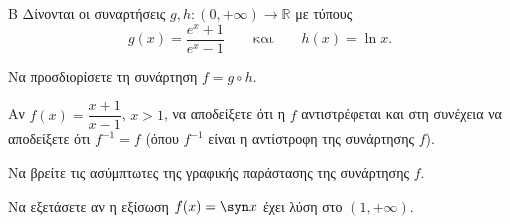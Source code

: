 \begin{thema}{Β}
Δίνονται οι συναρτήσεις $g, h: (0, +\infty) \to \mathbb{R}$ με τύπους
\[
g(x) = \frac{e^x + 1}{e^x - 1} \qquad \text{και} \qquad h(x) = \ln x.
\]
\begin{erwthma}
    \item Να προσδιορίσετε τη συνάρτηση $f = g \circ h$. 

    \item Αν $f(x) = \dfrac{x+1}{x-1}$, $x > 1$, να αποδείξετε ότι η $f$ αντιστρέφεται και στη συνέχεια να αποδείξετε ότι $f^{-1} = f$ (όπου $f^{-1}$ είναι η αντίστροφη της συνάρτησης $f$). 

    \item Να βρείτε τις ασύμπτωτες της γραφικής παράστασης της συνάρτησης $f$. 

    \item Να εξετάσετε αν η εξίσωση $f(x) = \syn x$ έχει λύση στο $(1, +\infty)$. 
\end{erwthma}
\end{thema}


